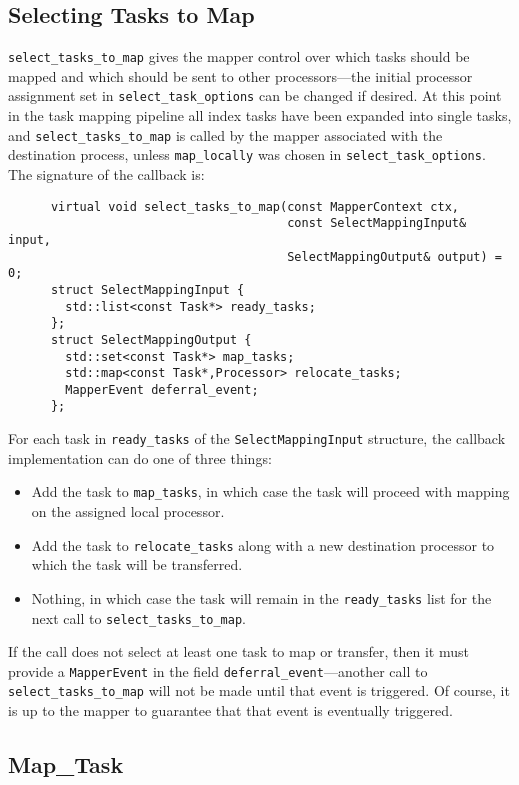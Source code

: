 \subsection{Selecting Tasks to Map}
{\tt select\_tasks\_to\_map} gives the mapper control over which tasks should be mapped and which should be sent to other processors---the initial processor assignment set in {\tt select\_task\_options} can be changed if desired.  At this point
in the task mapping pipeline all index tasks have been expanded into single tasks, and {\tt select\_tasks\_to\_map} is called by the mapper associated with the destination process, unless {\tt map\_locally} was chosen in {\tt select\_task\_options}.
The signature of the callback is:
\begin{lstlisting}
      virtual void select_tasks_to_map(const MapperContext ctx,
                                       const SelectMappingInput& input,
                                       SelectMappingOutput& output) = 0;
      struct SelectMappingInput {
        std::list<const Task*> ready_tasks;
      };
      struct SelectMappingOutput {
        std::set<const Task*> map_tasks;
        std::map<const Task*,Processor> relocate_tasks;
        MapperEvent deferral_event;
      };
\end{lstlisting}
For each task in {\tt ready\_tasks} of the {\tt SelectMappingInput} structure, the callback implementation can do one of three things:
\begin{itemize}
\item Add the task to {\tt map\_tasks}, in which case the task will proceed with mapping on the assigned local processor.
\item Add the task to {\tt relocate\_tasks} along with a new destination processor to which the task will be transferred.
\item Nothing, in which case the task will remain in the {\tt ready\_tasks} list for the next call to {\tt select\_tasks\_to\_map}.
\end{itemize}
If the call does not select at least one task to map or transfer, then it must provide a {\tt MapperEvent} in the field {\tt deferral\_event}---another call to {\tt select\_tasks\_to\_map} will not be made until that event is triggered.
Of course, it is up to the mapper to guarantee that that event is eventually triggered.

\subsection{Map\_Task}
\label{subsec:maptask}

